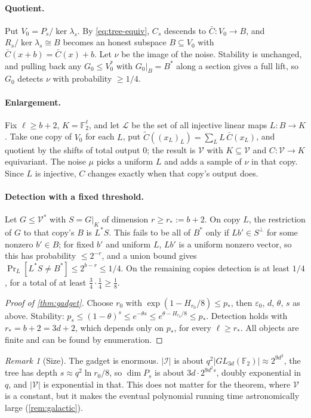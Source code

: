 \documentclass[11pt]{article}
\theoremstyle{definition}
\theoremstyle{remark}
\newtheorem{remark}[theorem]{Remark}
\newcommand{\F}{\mathbb F}
\newcommand{\eps}{\varepsilon}
\newcommand{\V}{\mathcal V}
\newcommand{\abs}[1]{\lvert #1\rvert}
\begin{document}
\paragraph{Quotient.} Put $V_0=P_s/\ker\lambda_s$. By \eqref{eq:tree-equiv},
$C_s$ descends to $\bar C\colon V_0\to B$, and $R_s/\ker\lambda_s\cong B$
becomes an honest subspace $B\subseteq V_0$ with $\bar C(x+b)=\bar C(x)+b$.
Let $\nu$ be the image of the noise. Stability is unchanged, and pulling back
any $G_0\le V_0^*$ with $G_0|_B=B^*$ along a section gives a full lift, so
$G_0$ detects $\nu$ with probability $\ge1/4$.

\paragraph{Enlargement.} Fix $\ell\ge b+2$, $K=\F_2^\ell$, and let $\mathcal L$
be the set of all injective linear maps $L\colon B\to K$. Take one copy of $V_0$
for each $L$, put $\widetilde C((x_L)_L)=\sum_LL\,\bar C(x_L)$, and quotient by
the shifts of total output $0$; the result is $\V$ with $K\subseteq\V$ and
$C\colon\V\to K$ equivariant. The noise $\mu$ picks a uniform $L$ and adds a
sample of $\nu$ in that copy. Since $L$ is injective, $C$ changes exactly when
that copy's output does.

\paragraph{Detection with a fixed threshold.} Let $G\le\V^*$ with
$S=G|_K$ of dimension $r\ge r_*:=b+2$. On copy $L$, the restriction of $G$ to
that copy's $B$ is $L^*S$. This fails to be all of $B^*$ only if
$Lb'\in S^\perp$ for some nonzero $b'\in B$; for fixed $b'$ and uniform $L$,
$Lb'$ is a uniform nonzero vector, so this has probability $\le2^{-r}$, and a
union bound gives $\Pr_L[L^*S\ne B^*]\le2^{b-r}\le1/4$. On the remaining copies
detection is at least $1/4$, for a total of at least $\tfrac34\cdot\tfrac14\ge\tfrac18$.

\begin{proof}[Proof of \cref{thm:gadget}]
Choose $r_0$ with $\exp(1-H_{r_0}/8)\le p_*$, then $\eps_0$, $d$, $\theta$, $s$
as above. Stability: $p_s\le(1-\theta)^s\le e^{-\theta s}\le e^{\theta-H_{r_0}/8}\le p_*$.
Detection holds with $r_*=b+2=3d+2$, which depends only on $p_*$, for every
$\ell\ge r_*$. All objects are finite and can be found by enumeration.
\end{proof}

\begin{remark}[Size]
The gadget is enormous. $\abs{\mathcal I}$ is about $q^2\abs{GL_{3d}(\F_2)}\approx2^{9d^2}$,
the tree has depth $s\approx q^2\ln r_0/8$, so $\dim P_s$ is about
$3d\cdot2^{9d^2s}$, doubly exponential in $q$, and $\abs{\V}$ is exponential in
that. This does not matter for the theorem, where $\V$ is a constant, but it
makes the eventual polynomial running time astronomically large
(\cref{rem:galactic}).
\end{remark}
\end{document}
